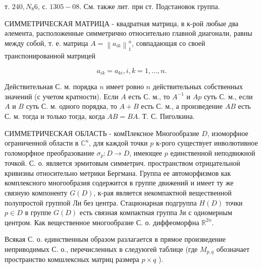 \documentclass[10pt]{article}
\begin{document}
т. $240, N_{8} 6$, с. $1305-08$. См. также лит. при ст. Подстановок группа.



СИММЕТРИЧЕСКАЯ МАТРИЦА - квадратная матрица, в к-рой любые два әлемента, расположенные симметрично относительно главной диагонали, равны между собой, т. е. матрица $A=\left\|a_{i k}\right\|_{1}^{n}$, совпадающая со своей транспонированной матрицей



\[

a_{i k}=a_{k i}, i, k=1, \ldots, n .

\]



Действительная С. м. порядка $n$ имеет ровно $n$ действительных собственных значений (с учетом кратности). Если $A$ есть С. м., то $A^{-1}$ и $A p$ суть С. м., если $A$ и $B$ суть С. м. одного порядка, то $A+B$ есть С. м., а произведение $A B$ есть С. м. тогда и только тогда, когда $A B=B A$. Т. С. Пиголкина.



СИММЕТРИЧЕСКАЯ ОБЛАСТЬ - комПлексное Многообразие $D$, изоморфное ограниченной области в $\mathbb{C}^{n}$, для каждой точки $p$ к-рого существует инволютивное голоморфное преобразование $\sigma_{p}: D \rightarrow D$, имеющее $p$ единственной неподвижной точкой. С. о. является эрмитовым симметрич. пространством отрицательноӥ кривизны относительно метрики Бергмана. Группа ее автоморфизмов как комплексного многообразия содержится в группе движений и имеет ту же связную компоненту $G(D)$, к-рая является некомпактной вещественной полупростой группой Ли без центра. Стационарная подгруппа $H(D)$ точки $p \in D$ в группе $G(D)$ есть связная компактная группа Ји с одномерным центром. Как вещественное многообразие С. о. диффеоморфна $\mathbb{R}^{2 n}$.



Всякая С. о. единственным образом разлагается в прямое произведение неприводимых С. о., перечисленных в следуюгей таблице (где $M_{p, q}$ обозначает пространство комшлексных матриц размера $p \times q$ ).
\end{document}
